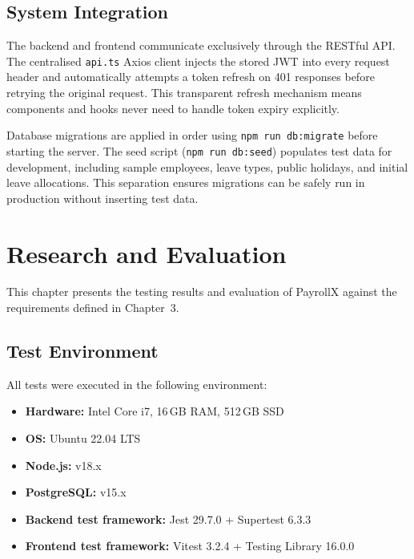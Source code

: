 \documentclass[12pt,a4paper]{report}
\begin{document}
\section{System Integration}

The backend and frontend communicate exclusively through the RESTful API. The centralised \texttt{api.ts} Axios client injects the stored JWT into every request header and automatically attempts a token refresh on 401 responses before retrying the original request. This transparent refresh mechanism means components and hooks never need to handle token expiry explicitly.

Database migrations are applied in order using \texttt{npm run db:migrate} before starting the server. The seed script (\texttt{npm run db:seed}) populates test data for development, including sample employees, leave types, public holidays, and initial leave allocations. This separation ensures migrations can be safely run in production without inserting test data.

\chapter{Research and Evaluation}
\label{chap:research}

This chapter presents the testing results and evaluation of PayrollX against the requirements defined in Chapter~3.

\section{Test Environment}

All tests were executed in the following environment:
\begin{itemize}
    \item \textbf{Hardware:} Intel Core i7, 16\,GB RAM, 512\,GB SSD
    \item \textbf{OS:} Ubuntu 22.04 LTS
    \item \textbf{Node.js:} v18.x
    \item \textbf{PostgreSQL:} v15.x
    \item \textbf{Backend test framework:} Jest 29.7.0 + Supertest 6.3.3
    \item \textbf{Frontend test framework:} Vitest 3.2.4 + Testing Library 16.0.0
\end{itemize}
\end{document}
